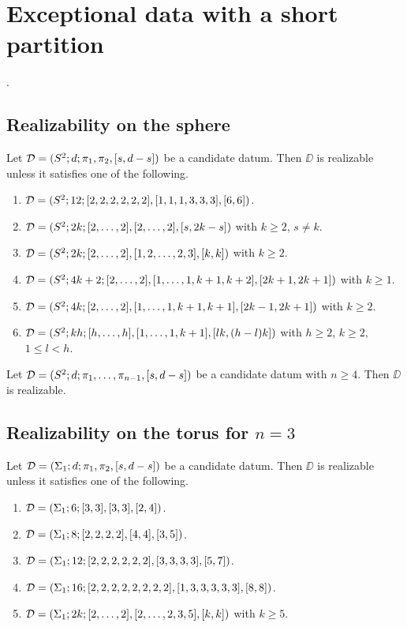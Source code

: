 \chapter{Exceptional data with a short partition}
.

\section{Realizability on the sphere}

\begin{theorem}\label{short-partition:th:realizability-on-sphere-n-3}
Let $\mathcal{D}=(S^2{};d;\pi_1,\pi_2,[s,d-s])$ be a candidate datum. Then $\DD$ is realizable unless it satisfies one of the following.
\begin{enumerate}[(1)]
\item $\mathcal{D}=(S^2{};12;[2,2,2,2,2,2],[1,1,1,3,3,3],[6,6])$.
\item $\mathcal{D}=(S^2{};2k;[2,\ldots,2],[2,\ldots,2],[s,2k-s])$ with $k\ge 2$, $s\neq k$.
\item $\mathcal{D}=(S^2{};2k;[2,\ldots,2],[1,2,\ldots,2,3],[k,k])$ with $k\ge2$.
\item $\mathcal{D}=(S^2{};4k+2;[2,\ldots,2],[1,\ldots,1,k+1,k+2],[2k+1,2k+1])$ with $k\ge 1$.
\item $\mathcal{D}=(S^2{};4k;[2,\ldots,2],[1,\ldots,1,k+1,k+1],[2k-1,2k+1])$ with $k\ge2$.
\item $\mathcal{D}=(S^2{};kh;[h,\ldots,h],[1,\ldots,1,k+1],[lk,(h-l)k])$ with $h\ge 2$, $k\ge 2$, $1\le l<h$.
\end{enumerate}
\end{theorem}

\begin{theorem}\label{short-partition:th:realizability-on-sphere-n-ge-4}
Let $\mathcal{D}=(S^2{};d;\pi_1,\ldots,\pi_{n-1},[s,d-s])$ be a candidate datum with $n\ge 4$. Then $\DD$ is realizable.
\end{theorem}

\section{Realizability on the torus for $n=3$}

\begin{theorem}
Let $\mathcal{D}=(\Sigma_{1};d;\pi_1,\pi_2,[s,d-s])$ be a candidate datum. Then $\DD$ is realizable unless it satisfies one of the following.
\begin{enumerate}[(1)]
\item $\mathcal{D}=(\Sigma_{1};6;[3,3],[3,3],[2,4])$.
\item $\mathcal{D}=(\Sigma_{1};8;[2,2,2,2],[4,4],[3,5])$.
\item $\mathcal{D}=(\Sigma_{1};12;[2,2,2,2,2,2],[3,3,3,3],[5,7])$.
\item $\mathcal{D}=(\Sigma_{1};16;[2,2,2,2,2,2,2,2],[1,3,3,3,3,3],[8,8])$.
\item $\mathcal{D}=(\Sigma_{1};2k;[2,\ldots,2],[2,\ldots,2,3,5],[k,k])$ with $k\ge 5$.
\end{enumerate}
\end{theorem}

